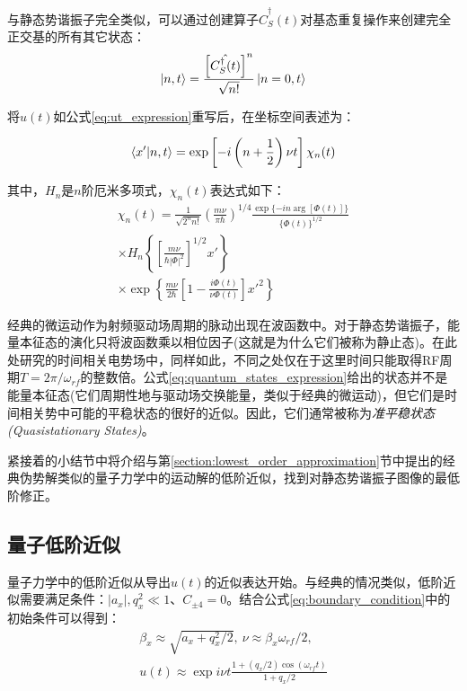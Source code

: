 与静态势谐振子完全类似，可以通过创建算子$\hat{C}_S^\dagger(t)$对基态重复操作来创建完全正交基的所有其它状态：
\begin{align}
    \ket{n,t}=\frac{\left[\hat{C_S^\dagger(t)}\right]^n}{\sqrt{n!}}\ket{n=0,t}\label{eq:basic_sattes}
\end{align}

将$u(t)$如公式\eqref{eq:ut_expression}重写后，在坐标空间表述为：

\begin{align}
    \braket{x'|n,t}=\exp\left[-i\left(n+\frac{1}{2}\right)\nu t\right]\chi_n(t) \label{eq:quantum_states_expression}
\end{align}

其中，$H_n$是$n$阶厄米多项式，$\chi_n(t)$表达式如下：
\begin{align}
    \chi_n(t)=\frac{1}{\sqrt{2^n n!}}\left(\frac{m\nu}{\pi  \hbar}\right)^{1/4}
    \frac{\exp\{-i n \arg\left[\Phi(t)\right]\}}{\{\Phi(t)\}^{1/2}}\\
    \times H_n\left\{\left[\frac{m\nu}{\hbar|\Phi|^2}\right]^{1/2}x'\right\}\\
    \times \exp\left\{\frac{m\nu }{2\hbar}\left[1-\frac{i\Phi(t)}{\nu\Phi(t)}\right]x'^2\right\}
\end{align}

经典的微运动作为射频驱动场周期的脉动出现在波函数中。对于静态势谐振子，能量本征态的演化只将波函数乘以相位因子(这就是为什么它们被称为静止态)。在此处研究的时间相关电势场中，同样如此，不同之处仅在于这里时间只能取得RF周期$T=2\pi/\omega_{rf}$的整数倍。公式\ref{eq:quantum_states_expression}给出的状态并不是能量本征态(它们周期性地与驱动场交换能量，类似于经典的微运动)，但它们是时间相关势中可能的平稳状态的很好的近似。因此，它们通常被称为\emph{准平稳状态(Quasistationary States)}。

紧接着的小结节中将介绍与第\ref{section:lowest_order_approximation}节中提出的经典伪势解类似的量子力学中的运动解的低阶近似，找到对静态势谐振子图像的最低阶修正。


\subsection[量子低阶近似]{量子低阶近似}
量子力学中的低阶近似从导出$u(t)$的近似表达开始。与经典的情况类似，低阶近似需要满足条件：$|a_x|,q_x^2\ll 1$、$C_{\pm 4}=0$。结合公式\eqref{eq:boundary_condition}中的初始条件可以得到：
\begin{align}
    \beta_x\approx\sqrt{a_x+q_x^2/2},\ \nu\approx\beta_x\omega_{rf}/2,\\
    u(t)\approx\exp{i\nu t}\frac{1+(q_x/2)\cos(\omega_{rf}t)}{1+q_x/2}
\end{align}

